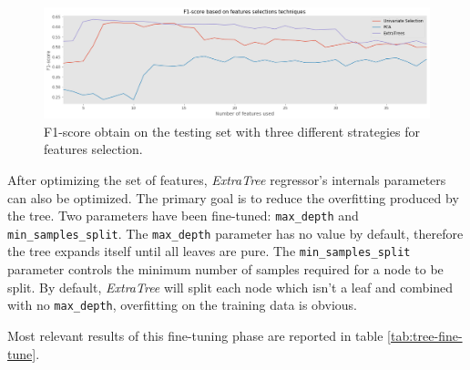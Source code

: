 \begin{figure}[htbp]
    \centering
    \includegraphics[width=15cm]{images/feature_selection.png}
    \caption[F1-score based on feature selection]{F1-score obtain on the testing set with three different strategies for features selection.}
    \label{fig:feature-selection}
\end{figure}


After optimizing the set of features, \textit{ExtraTree} regressor's internals parameters can also be optimized. The primary goal is to reduce the overfitting produced by the tree. Two parameters have been fine-tuned: \texttt{max\_depth} and \texttt{min\_samples\_split}. The \texttt{max\_depth} parameter has no value by default, therefore the tree expands itself until all leaves are pure. The \texttt{min\_samples\_split} parameter controls the minimum number of samples required for a node to be split. By default, \textit{ExtraTree} will split each node which isn't a leaf and combined with no \texttt{max\_depth}, overfitting on the training data is obvious. 

Most relevant results of this fine-tuning phase are reported in table \ref{tab:tree-fine-tune}.

